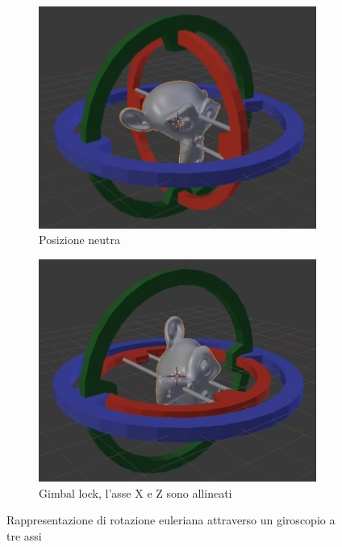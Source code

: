 \begin{figure}
\centering
\begin{subfigure}{.5\textwidth}
  \centering
  \includegraphics[width=.9\linewidth]{Figures/euler-1.jpg}
  \caption{Posizione neutra}
  \label{fig:sub1}
\end{subfigure}%
\begin{subfigure}{.5\textwidth}
  \centering
  \includegraphics[width=.9\linewidth]{Figures/euler-2.jpg}
  \caption{Gimbal lock, l'asse X e Z sono allineati}
  \label{fig:sub2}
\end{subfigure}
\decoRule
\caption[Rotazione euleriana]{Rappresentazione di rotazione euleriana attraverso un giroscopio a tre assi}
\label{fig:euler1}
\end{figure}

